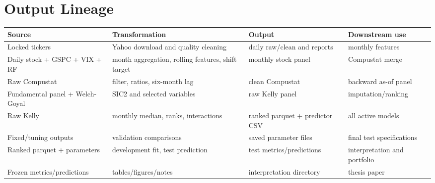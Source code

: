 \documentclass[
  11pt,
  a4paper]{article}
\newcounter{none} %
\begin{document}
\section{Output Lineage}\label{app-output-lineage}

{\def\LTcaptype{none} %
\begin{longtable}[]{@{}
  >{\raggedright\arraybackslash}p{}
  >{\raggedright\arraybackslash}p{}
  >{\raggedright\arraybackslash}p{}
  >{\raggedright\arraybackslash}p{}@{}}
\toprule\noalign{}
\begin{minipage}[b]{\linewidth}\raggedright
Source
\end{minipage} & \begin{minipage}[b]{\linewidth}\raggedright
Transformation
\end{minipage} & \begin{minipage}[b]{\linewidth}\raggedright
Output
\end{minipage} & \begin{minipage}[b]{\linewidth}\raggedright
Downstream use
\end{minipage} \\
\midrule\noalign{}
\endhead
\bottomrule\noalign{}
\endlastfoot
Locked tickers & Yahoo download and quality cleaning & daily raw/clean
and reports & monthly features \\
Daily stock + GSPC + VIX + RF & month aggregation, rolling features,
shift target & monthly stock panel & Compustat merge \\
Raw Compustat & filter, ratios, six-month lag & clean Compustat &
backward as-of panel \\
Fundamental panel + Welch-Goyal & SIC2 and selected variables & raw
Kelly panel & imputation/ranking \\
Raw Kelly & monthly median, ranks, interactions & ranked parquet +
predictor CSV & all active models \\
Fixed/tuning outputs & validation comparisons & saved parameter files &
final test specifications \\
Ranked parquet + parameters & development fit, test prediction & test
metrics/predictions & interpretation and portfolio \\
Frozen metrics/predictions & tables/figures/notes & interpretation
directory & thesis paper \\
\end{longtable}
}
\end{document}
